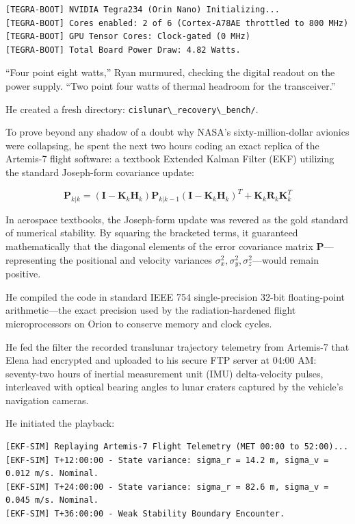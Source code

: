 \documentclass[12pt,twoside,openright]{book}
\begin{document}
\begin{lstlisting}
[TEGRA-BOOT] NVIDIA Tegra234 (Orin Nano) Initializing...
[TEGRA-BOOT] Cores enabled: 2 of 6 (Cortex-A78AE throttled to 800 MHz)
[TEGRA-BOOT] GPU Tensor Cores: Clock-gated (0 MHz)
[TEGRA-BOOT] Total Board Power Draw: 4.82 Watts.
\end{lstlisting}

``Four point eight watts,'' Ryan murmured, checking the digital readout
on the power supply. ``Two point four watts of thermal headroom for the
transceiver.''

He created a fresh directory:
\passthrough{\lstinline!cislunar\_recovery\_bench/!}.

To prove beyond any shadow of a doubt why NASA's sixty-million-dollar
avionics were collapsing, he spent the next two hours coding an exact
replica of the Artemis-7 flight software: a textbook Extended Kalman
Filter (EKF) utilizing the standard Joseph-form covariance update:

\[\mathbf{P}_{k|k} = (\mathbf{I} - \mathbf{K}_k \mathbf{H}_k) \mathbf{P}_{k|k-1} (\mathbf{I} - \mathbf{K}_k \mathbf{H}_k)^T + \mathbf{K}_k \mathbf{R}_k \mathbf{K}_k^T\]

In aerospace textbooks, the Joseph-form update was revered as the gold
standard of numerical stability. By squaring the bracketed terms, it
guaranteed mathematically that the diagonal elements of the error
covariance matrix \(\mathbf{P}\)---representing the positional and
velocity variances \(\sigma_x^2, \sigma_y^2, \sigma_z^2\)---would remain
positive.

He compiled the code in standard IEEE 754 single-precision 32-bit
floating-point arithmetic---the exact precision used by the
radiation-hardened flight microprocessors on Orion to conserve memory
and clock cycles.

He fed the filter the recorded translunar trajectory telemetry from
Artemis-7 that Elena had encrypted and uploaded to his secure FTP server
at 04:00 AM: seventy-two hours of inertial measurement unit (IMU)
delta-velocity pulses, interleaved with optical bearing angles to lunar
craters captured by the vehicle's navigation cameras.

He initiated the playback:

\begin{lstlisting}
[EKF-SIM] Replaying Artemis-7 Flight Telemetry (MET 00:00 to 52:00)...
[EKF-SIM] T+12:00:00 - State variance: sigma_r = 14.2 m, sigma_v = 0.012 m/s. Nominal.
[EKF-SIM] T+24:00:00 - State variance: sigma_r = 82.6 m, sigma_v = 0.045 m/s. Nominal.
[EKF-SIM] T+36:00:00 - Weak Stability Boundary Encounter.
\end{lstlisting}
\end{document}
